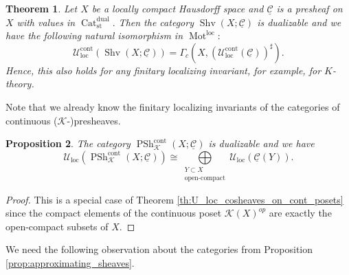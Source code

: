 \documentclass[11pt,leqno]{amsart}
\newtheorem{theo}{Theorem}[section]
\newtheorem{prop}[theo]{Proposition}
\numberwithin{equation}{section}
\newcommand{\ms}[1]{\mathscr{#1}}
\newcommand{\msK}{\ms{K}}
\newcommand{\biggplus}[1][]{\mathop{\bigoplus}\limits_{#1}}
\newcommand{\Mot}{\operatorname{Mot}}
\newcommand{\Cat}{\operatorname{Cat}}
\newcommand{\loc}{\operatorname{loc}}
\newcommand{\cont}{\operatorname{cont}}
\newcommand{\st}{\operatorname{st}}
\newcommand{\dual}{\operatorname{dual}}
\newcommand{\cF}{{\mathcal F}}
\newcommand{\cC}{{\mathcal C}}
\newcommand{\cU}{{\mathcal U}}
\newcommand{\un}{\underline}
\newcommand{\PSh}{\operatorname{PSh}}
\newcommand{\Sh}{\operatorname{Shv}}
\newcommand{\res}{\operatorname{res}}
\begin{document}
\begin{theo}\label{th:U_loc_locally_compact} Let $X$ be a locally compact Hausdorff space and $\un{\cC}$ is a presheaf on $X$ with values in $\Cat_{\st}^{\dual}.$ Then the category $\Sh(X;\un{\cC})$ is dualizable and we have the following natural isomorphism in $\Mot^{\loc}:$
$$\cU_{\loc}^{\cont}(\Sh(X;\un{\cC}))=\Gamma_c(X,(\cU_{\loc}^{\cont}(\un{\cC}))^{\sharp}).$$
Hence, this also holds for any finitary localizing invariant, for example, for $K$-theory.\end{theo}


Note that we already know the finitary localizing invariants of the categories of continuous ($\msK$-)presheaves.

\begin{prop}\label{prop:U_loc_cont_presheaves} The category $\PSh_{\msK}^{\cont}(X;\un{\cC})$ is dualizable and we have
$$\cU_{\loc}(\PSh_{\msK}^{\cont}(X;\un{\cC}))\cong\biggplus[\substack{Y\subset X\\ \text{open-compact}}]\cU_{\loc}(\un{\cC}(Y)).$$\end{prop}

\begin{proof}This is a special case of Theorem \ref{th:U_loc_cosheaves_on_cont_posets} since the compact elements of the continuous poset $\msK(X)^{op}$ are exactly the open-compact subsets of $X.$\end{proof}





We need the following observation about the categories from Proposition \ref{prop:approximating_sheaves}.
\end{document}
